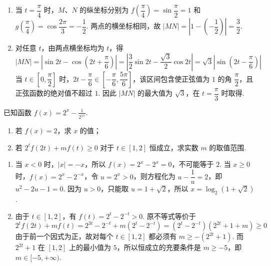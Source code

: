 \begin{solution}
\begin{enumerate}
\item 当 \(t=\dfrac{\pi}{4}\) 时，\(M\)、\(N\) 的纵坐标分别为 \(f\left(\dfrac{\pi}{4}\right)=\sin\dfrac{\pi}{2}=1\) 和 \(g\left(\dfrac{\pi}{4}\right)=\cos\dfrac{2\pi}{3}=-\dfrac{1}{2}\). 两点的横坐标相同，故 \(\left|MN\right|=\left|1-\left(-\dfrac{1}{2}\right)\right|=\dfrac{3}{2}\).
\item 对任意 \(t\)，由两点横坐标均为 \(t\)，得
\[
\left|MN\right|=\left|\sin2t-\cos\left(2t+\frac{\pi}{6}\right)\right|=\left|\frac{3}{2}\sin2t-\frac{\sqrt{3}}{2}\cos2t\right|=\sqrt{3}\left|\sin\left(2t-\frac{\pi}{6}\right)\right|
\]
当 \(t\in\left[0,\dfrac{\pi}{2}\right]\) 时，\(2t-\dfrac{\pi}{6}\in\left[-\dfrac{\pi}{6},\dfrac{5\pi}{6}\right]\)，该区间包含使正弦值为 \(1\) 的角 \(\dfrac{\pi}{2}\)，且正弦函数的绝对值不超过 \(1\). 因此 \(\left|MN\right|\) 的最大值为 \(\sqrt{3}\)，在 \(t=\dfrac{\pi}{3}\) 时取得.
\end{enumerate}
\end{solution}

\begin{problem}
已知函数 \( f(x) = 2^x - \frac{1}{2^{|x|}} \).
\begin{enumerate}
\item 若 \( f(x)=2 \)，求 \(x\) 的值；
\item 若 \(2^{t}f(2t) + mf(t) \geqslant 0\) 对于 \(t \in [1,2]\) 恒成立，求实数 \(m\) 的取值范围.
\end{enumerate}
\end{problem}

\begin{solution}
\begin{enumerate}
\item 当 \(x<0\) 时，\(\lvert x\rvert=-x\)，所以 \(f(x)=2^{x}-2^{x}=0\)，不可能等于 \(2\). 当 \(x\geqslant0\) 时，\(f(x)=2^{x}-2^{-x}\)，令 \(u=2^{x}>0\)，则方程化为 \(u-\dfrac{1}{u}=2\)，即 \(u^{2}-2u-1=0\). 因为 \(u>0\)，只能取 \(u=1+\sqrt{2}\)，所以 \(x=\log_{2}\left(1+\sqrt{2}\right)\).
\item 由于 \(t\in[1,2]\)，有 \(f(t)=2^{t}-2^{-t}>0\). 原不等式等价于
\[
2^{t}f(2t)+mf(t)=2^{3t}-2^{-t}+m\left(2^{t}-2^{-t}\right)=\left(2^{t}-2^{-t}\right)\left(2^{2t}+1+m\right)\geqslant0
\]
由于前一个因式为正，故对每个 \(t\in[1,2]\) 都必须有 \(m\geqslant-(2^{2t}+1)\). 而 \(2^{2t}+1\) 在 \([1,2]\) 上的最小值为 \(5\)，所以恒成立的充要条件是 \(m\geqslant-5\)，即 \(m\in[-5,+\infty)\).
\end{enumerate}
\end{solution}

